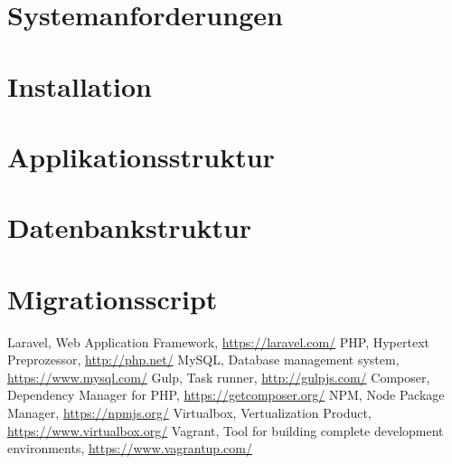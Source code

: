 \documentclass[12pt, letterpaper]{report}
\begin{document}
    \chapter{Systemanforderungen}
    

    \chapter{Installation}
    

    \chapter{Applikationsstruktur}
    

    \clearpage
    \chapter{Datenbankstruktur}
    

    \chapter{Migrationsscript}
    

    \clearpage

    \begin{thebibliography}{500} %
        Laravel, Web Application Framework, \url{https://laravel.com/}
        PHP, Hypertext Preprozessor, \url{http://php.net/}
        MySQL, Database management system, \url{https://www.mysql.com/}
        Gulp, Task runner, \url{http://gulpjs.com/}
        Composer, Dependency Manager for PHP, \url{https://getcomposer.org/}
        NPM, Node Package Manager, \url{https://npmjs.org/}
        Virtualbox, Vertualization Product, \url{https://www.virtualbox.org/}
        Vagrant, Tool for building complete development environments, \url{https://www.vagrantup.com/}
    \end{thebibliography}
    \lstlistoflistings
    \listoffigures
\end{document}
